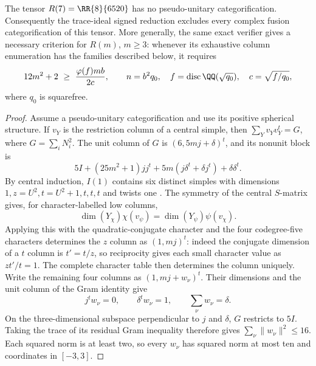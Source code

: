 \begin{proposition}
\label{prop:quadratic-gauss-family}
The tensor $R(7)=\RR{8}{6520}$ has no pseudo-unitary categorification.
Consequently the trace-ideal signed reduction excludes every complex
fusion categorification of this tensor.
More generally, the same exact verifier gives a necessary criterion for
$R(m)$, $m\ge3$: whenever its exhaustive column enumeration has the
families described below, it requires
\[
 12m^2+2\ \ge\ \frac{\varphi(f)m b}{2c},\qquad
 n=b^2q_0,\quad f=\operatorname{disc}\QQ(\sqrt{q_0}),\quad
 c=\sqrt{f/q_0},
\]
where $q_0$ is squarefree.
\end{proposition}
\begin{proof}
Assume a pseudo-unitary categorification and use its positive spherical
structure.  If $v_Y$ is the restriction column of a central simple, then
$\sum_Yv_Yv_Y^t=G$, where $G=\sum_iN_i^2$.
The unit column of $G$ is $(6,5mj+\delta)^t$, and its nonunit block is
\[
 5I+(25m^2+1)jj^t+5m(j\delta^t+\delta j^t)+\delta\delta^t.
\]
By central induction, $I(1)$ contains six distinct simples with dimensions
$1,z=U^2,t=U^2+1,t,t,t$ and twists one
\cite[Theorems 2.5 and 2.13]{Ostrik3}.
The symmetry of the central $S$-matrix gives, for character-labelled low
columns,
\[
 \dim(Y_\chi)\chi(v_\psi)=\dim(Y_\psi)\psi(v_\chi).
\]
Applying this with the quadratic-conjugate character and the four
codegree-five characters determines the $z$ column as $(1,mj)^t$:
indeed the conjugate dimension of a $t$ column is $t'=t/z$, so
reciprocity gives each small character value as $zt'/t=1$.  The complete
character table then determines the column uniquely.  Write the remaining four columns as
$(1,mj+w_\nu)^t$.  Their dimensions and the unit column of the Gram identity
give
\[
 j^tw_\nu=0,\qquad \delta^tw_\nu=1,\qquad
 \sum_\nu w_\nu=\delta.
\]
On the three-dimensional subspace perpendicular to $j$ and $\delta$,
$G$ restricts to $5I$.  Taking the trace of its residual Gram inequality
therefore gives $\sum_\nu\|w_\nu\|^2\le16$.  Each squared norm is at least
two, so every $w_\nu$ has squared norm at most ten and coordinates in
$[-3,3]$.


\end{proof}
